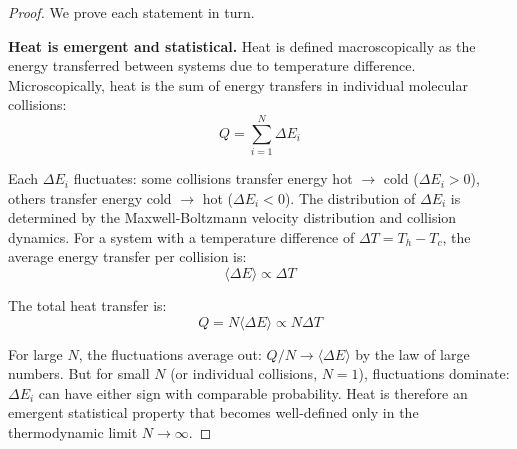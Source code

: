\documentclass[12pt,a4paper]{article}
\theoremstyle{definition}
\theoremstyle{remark}
\begin{document}
\begin{proof}
We prove each statement in turn.

\textbf{Heat is emergent and statistical.}
Heat is defined macroscopically as the energy transferred between systems due to temperature difference. Microscopically, heat is the sum of energy transfers in individual molecular collisions:
\begin{equation}
Q = \sum_{i=1}^{N} \Delta E_i
\end{equation}

Each $\Delta E_i$ fluctuates: some collisions transfer energy hot $\to$ cold ($\Delta E_i > 0$), others transfer energy cold $\to$ hot ($\Delta E_i < 0$). The distribution of $\Delta E_i$ is determined by the Maxwell-Boltzmann velocity distribution and collision dynamics. For a system with a temperature difference of $\Delta T = T_h - T_c$, the average energy transfer per collision is:
\begin{equation}
\langle \Delta E \rangle \propto \Delta T
\end{equation}

The total heat transfer is:
\begin{equation}
Q = N \langle \Delta E \rangle \propto N \Delta T
\end{equation}

For large $N$, the fluctuations average out: $Q / N \to \langle \Delta E \rangle$ by the law of large numbers. But for small $N$ (or individual collisions, $N = 1$), fluctuations dominate: $\Delta E_i$ can have either sign with comparable probability. Heat is therefore an emergent statistical property that becomes well-defined only in the thermodynamic limit $N \to \infty$.


\end{proof}
\end{document}
